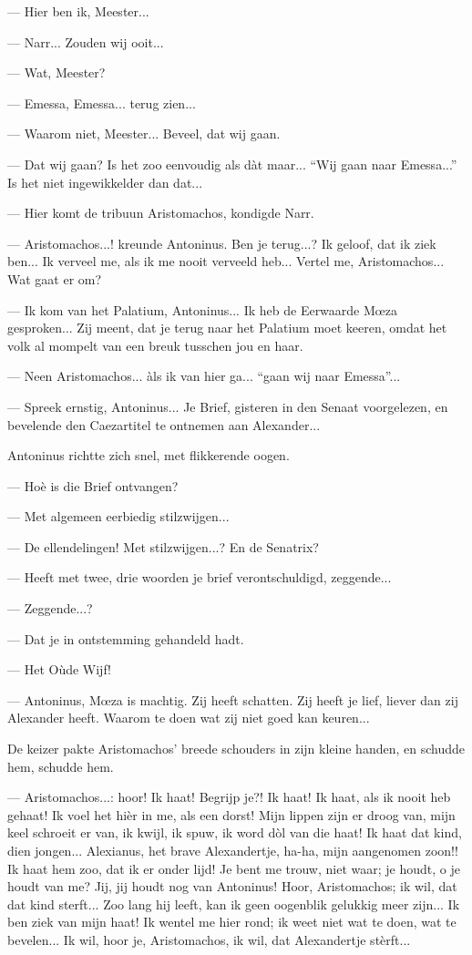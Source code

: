 \documentclass[a4paper, 12pt, oneside, dutch]{article}
\begin{document}
--- Hier ben ik, Meester...

--- Narr... Zouden wij ooit...

--- Wat, Meester?

--- Emessa, Emessa... terug zien...

--- Waarom niet, Meester... Beveel, dat wij gaan.

--- Dat wij gaan? Is het zoo eenvoudig als dàt maar... "`Wij gaan naar Emessa..."' Is het niet ingewikkelder dan dat...

--- Hier komt de tribuun Aristomachos, kondigde Narr.

--- Aristomachos...! kreunde Antoninus. Ben je terug...? Ik geloof, dat ik ziek ben... Ik verveel me, als ik me nooit verveeld heb... Vertel me, Aristomachos... Wat gaat er om?

--- Ik kom van het Palatium, Antoninus... Ik heb de Eerwaarde Mœza gesproken... Zij meent, dat je terug naar het Palatium moet keeren, omdat het volk al mompelt van een breuk tusschen jou en haar.

--- Neen Aristomachos... àls ik van hier ga... "`gaan wij naar Emessa"'...

--- Spreek ernstig, Antoninus... Je Brief, gisteren in den Senaat voorgelezen, en bevelende den Caezartitel te ontnemen aan Alexander...

Antoninus richtte zich snel, met flikkerende oogen.

--- Hoè is die Brief ontvangen?

--- Met algemeen eerbiedig stilzwijgen...

--- De ellendelingen! Met stilzwijgen...? En de Senatrix?

--- Heeft met twee, drie woorden je brief verontschuldigd, zeggende...

--- Zeggende...?

--- Dat je in ontstemming gehandeld hadt.

--- Het Oùde Wijf!

--- Antoninus, Mœza is machtig. Zij heeft schatten. Zij heeft je lief, liever dan zij Alexander heeft. Waarom te doen wat zij niet goed kan keuren...

De keizer pakte Aristomachos' breede schouders in zijn kleine handen, en schudde hem, schudde hem.

--- Aristomachos...: hoor! Ik haat! Begrijp je?! Ik haat! Ik haat, als ik nooit heb gehaat! Ik voel het hièr in me, als een dorst! Mijn lippen zijn er droog van, mijn keel schroeit er van, ik kwijl, ik spuw, ik word dòl van die haat! Ik haat dat kind, dien jongen... Alexianus, het brave Alexandertje, ha-ha, mijn aangenomen zoon!! Ik haat hem zoo, dat ik er onder lijd! Je bent me trouw, niet waar; je houdt, o je houdt van me? Jij, jij houdt nog van Antoninus! Hoor, Aristomachos; ik wil, dat dat kind sterft... Zoo lang hij leeft, kan ik geen oogenblik gelukkig meer zijn... Ik ben ziek van mijn haat! Ik wentel me hier rond; ik weet niet wat te doen, wat te bevelen... Ik wil, hoor je, Aristomachos, ik wil, dat Alexandertje stèrft...
\end{document}

